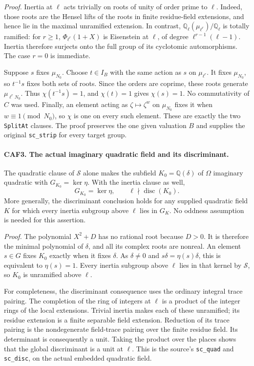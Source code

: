 \emph{Proof.}
Inertia at \(\ell\) acts trivially on roots of unity of order prime
to \(\ell\).  Indeed, those roots are the Hensel lifts of the roots
in finite residue-field extensions, and hence lie in the maximal
unramified extension.  In contrast,
\(\mathbb Q_\ell(\mu_{\ell^r})/\mathbb Q_\ell\) is totally
ramified: for \(r\ge1\),
\(\Phi_{\ell^r}(1+X)\) is Eisenstein at \(\ell\), of degree
\(\ell^{r-1}(\ell-1)\).  Inertia therefore surjects onto the full
group of its cyclotomic automorphisms.  The case \(r=0\) is immediate.

Suppose \(s\) fixes \(\mu_{N_0}\).  Choose \(t\in I_B\) with the
same action as \(s\) on \(\mu_{\ell^r}\).  It fixes
\(\mu_{N_0}\), so \(t^{-1}s\) fixes both sets of roots.  Since the
orders are coprime, these roots generate \(\mu_{\ell^rN_0}\).
Thus \(\chi(t^{-1}s)=1\), and \(\chi(t)=1\) gives \(\chi(s)=1\).
No commutativity of \(C\) was used.  Finally, an element acting as
\(\zeta\mapsto\zeta^w\) on \(\mu_{N_0}\) fixes it when
\(w\equiv1\pmod {N_0}\), so \(\chi\) is one on every such
element.  These are exactly the two \texttt{SplitAt} clauses.
The proof preserves the one given valuation \(B\) and supplies the
original \texttt{sc\_strip} for every target group.

\paragraph{CAF3. The actual imaginary quadratic field and its discriminant.}
\label{claim:CAF3}
The quadratic clause of \(\mathcal S\) alone makes the subfield
\(K_0=\mathbb Q(\delta)\) of \(\Omega\) imaginary quadratic with
\(G_{K_0}=\ker\eta\).  With the inertia clause as well,
\[
                 G_{K_0}=\ker\eta,\qquad
                 \ell\nmid\operatorname{disc}(K_0).
 \tag{CAF.6}
\]
More generally, the discriminant conclusion holds for any supplied
quadratic field \(K\) for which every inertia subgroup above
\(\ell\) lies in \(G_K\).  No oddness assumption is needed for
this assertion.

\emph{Proof.}
The polynomial \(X^2+D\) has no rational root because \(D>0\).
It is therefore the minimal polynomial of \(\delta\), and all its
complex roots are nonreal.  An element \(s\in G\) fixes \(K_0\)
exactly when it fixes \(\delta\).  As \(\delta\ne0\) and
\(s\delta=\eta(s)\delta\), this is equivalent to \(\eta(s)=1\).
Every inertia subgroup above \(\ell\) lies in that kernel by
\(\mathcal S\), so \(K_0\) is unramified above \(\ell\).

For completeness, the discriminant consequence uses the ordinary
integral trace pairing.  The completion of the ring of integers at
\(\ell\) is a product of the integer rings of the local extensions.
Trivial inertia makes each of these unramified; its residue extension
is a finite separable field extension.  Reduction of its trace pairing
is the nondegenerate field-trace pairing over the finite residue field.
Its determinant is consequently a unit.  Taking the product over the
places shows that the global discriminant is a unit at \(\ell\).
This is the source's \texttt{sc\_quad} and \texttt{sc\_disc}, on the
actual embedded quadratic field.

